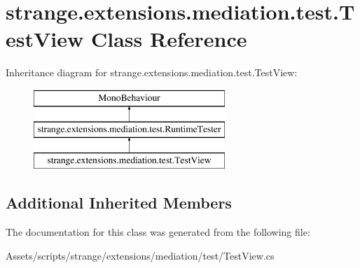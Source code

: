 \hypertarget{classstrange_1_1extensions_1_1mediation_1_1test_1_1_test_view}{\section{strange.\-extensions.\-mediation.\-test.\-Test\-View Class Reference}
\label{classstrange_1_1extensions_1_1mediation_1_1test_1_1_test_view}
}
Inheritance diagram for strange.\-extensions.\-mediation.\-test.\-Test\-View\-:\begin{figure}[H]
\begin{center}
\leavevmode
\includegraphics[height=3.000000cm]{classstrange_1_1extensions_1_1mediation_1_1test_1_1_test_view}
\end{center}
\end{figure}
\subsection*{Additional Inherited Members}


The documentation for this class was generated from the following file\-:\begin{DoxyCompactItemize}
\item 
Assets/scripts/strange/extensions/mediation/test/Test\-View.\-cs\end{DoxyCompactItemize}
